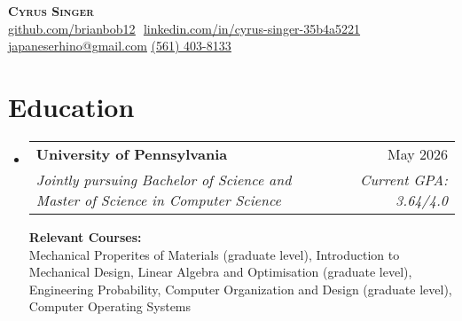 \documentclass[letterpaper,11pt]{article}
\makeatletter
\newcommand{\resumeSubheading}[4]{
  \vspace{-2pt}\item
    \begin{tabular*}{0.97\textwidth}[t]{l@{\extracolsep{\fill}}r}
      \textbf{#1} & #2 \\
      \textit{\small#3} & \textit{\small #4} \\
    \end{tabular*}\vspace{-7pt}
}
\newcommand{\resumeSubHeadingListStart}{\begin{itemize}[leftmargin=0.15in, label={}]}
\newcommand{\resumeSubHeadingListEnd}{\end{itemize}}
\makeatother
\begin{document}
\hfill

\begin{center}
    \textbf{\Huge \scshape Cyrus Singer} \\ \vspace{8pt}
    \small 
    \href{https://github.com/brianbob12}{\underline{github.com/brianbob12}} $  $
    \href{https://www.linkedin.com/in/cyrus-singer-35b4a5221}{\underline{linkedin.com/in/cyrus-singer-35b4a5221}} $  $
    \href{mailto:japaneserhino@gmail.com}
    {\underline{japaneserhino@gmail.com}}
    \href{tel:561-403-8133}{\underline{(561) 403-8133}}
\end{center}

\section{Education}
  \resumeSubHeadingListStart
  
    \resumeSubheading
      {University of Pennsylvania}{May 2026}
      {Jointly pursuing Bachelor of Science and Master of Science in Computer Science}{Current GPA: 3.64/4.0}
      
      \vspace{5pt}

      \textbf{Relevant Courses:} \\
      \small{
        Mechanical Properites of Materials (graduate level),
        Introduction to Mechanical Design,
        Linear Algebra and Optimisation (graduate level),
        Engineering Probability,
        Computer Organization and Design (graduate level),\\
        Computer Operating Systems
      }\\

  \resumeSubHeadingListEnd

\end{document}
